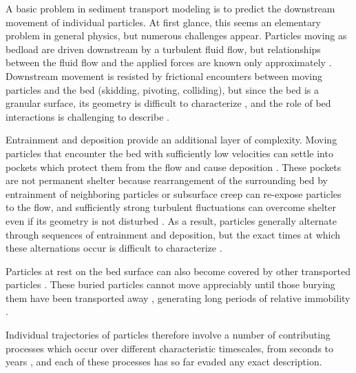 A basic problem in sediment transport modeling is to predict the downstream movement of individual particles.
At first glance, this seems an elementary problem in general physics, but numerous challenges appear.
Particles moving as bedload are driven downstream by a turbulent fluid flow, but relationships between the fluid flow and the applied forces are known only approximately \citep{Michaelides1997,Schmeeckle2007}.
Downstream movement is resisted by frictional encounters between moving particles and the bed (skidding, pivoting, colliding), but since the bed is a granular surface, its geometry is difficult to characterize \citep{Gordon1972}, and the role of bed interactions is challenging to describe \citep{Sekine1992, Nino1998}.

Entrainment and deposition provide an additional layer of complexity.
Moving particles that encounter the bed with sufficiently low velocities can settle into pockets which protect them from the flow \citep{Miller1966} and cause deposition \citep{Charru2004}.
These pockets are not permanent shelter because rearrangement of the surrounding bed by entrainment of neighboring particles or subsurface creep \citep{Houssais2016,Frey2014} can re-expose particles to the flow, and sufficiently strong turbulent fluctuations \citep{Cameron2020} can overcome shelter even if its geometry is not disturbed \citep{Valyrakis2010,Celik2014}. 
As a result, particles generally alternate through sequences of entrainment and deposition, but the exact times at which these alternations occur is difficult to characterize \citep{Einstein1937}.

Particles at rest on the bed surface can also become covered by other transported particles \citep{Yang1971}. 
These buried particles cannot move appreciably until those burying them have been transported away \citep{Nakagawa1981}, generating long periods of relative immobility \citep{Hassan1994,Ferguson2002}.

Individual trajectories of particles therefore involve a number of contributing processes which occur over different characteristic timescales, from seconds to years \citep{Pretzlav2021}, and each of these processes has so far evaded any exact description.

